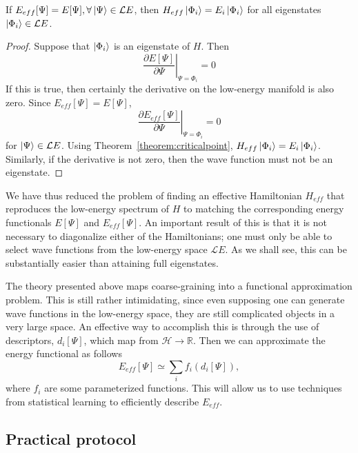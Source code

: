 \begin{theorem} 	
If $E_{eff}[\Psi] = E[\Psi], \forall \ket{\Psi} \in {\mathcal LE}$, then $H_{eff} \ket{\Phi_i} = E_i\ket{\Phi_i}$ for all eigenstates $\ket{\Phi_i}\in {\mathcal LE}$.
\end{theorem}
\begin{proof}
	Suppose that $\ket{\Phi_i}$ is an eigenstate of $H$. Then 
	\begin{equation}
	\left.\frac{\partial E[\Psi]}{\partial\Psi}\right|_{\Psi=\Phi_i} = 0 
	\end{equation}
If this is true, then certainly the derivative on the low-energy manifold is also zero.
Since $E_{eff}[\Psi] = E[\Psi]$, 
\begin{equation}
	\left.\frac{\partial E_{eff}[\Psi]}{\partial\Psi}\right|_{\Psi=\Phi_i} = 0 
\end{equation}
for $\ket{\Psi} \in {\mathcal LE}$. Using Theorem~\ref{theorem:criticalpoint}, $H_{eff} \ket{\Phi_i} = E_i\ket{\Phi_i}$. 
Similarly, if the derivative is not zero, then the wave function must not be an eigenstate.
\end{proof}

We have thus reduced the problem of finding an effective Hamiltonian $H_{eff}$ that reproduces the low-energy spectrum of $H$ to matching the corresponding energy functionals $E[\Psi]$ and $E_{eff}[\Psi]$. 
An important result of this is that it is not necessary to diagonalize either of the Hamiltonians; one must only be able to select wave functions from the low-energy space ${\mathcal LE}$.
As we shall see, this can be substantially easier than attaining full eigenstates.


The theory presented above maps coarse-graining into a functional approximation problem. 
This is still rather intimidating, since even supposing one can generate wave functions in the low-energy space, they are still complicated objects in a very large space.
An effective way to accomplish this is through the use of descriptors, $d_i[\Psi]$, which map from ${\mathcal H} \rightarrow \mathbb{R}$.
Then we can approximate the energy functional as follows
\begin{equation}
E_{eff}[\Psi] \simeq \sum_i f_i(d_i[\Psi]),
\end{equation}
where $f_i$ are some parameterized functions.
This will allow us to use techniques from statistical learning to efficiently describe $E_{eff}$.

\subsection{Practical protocol}

